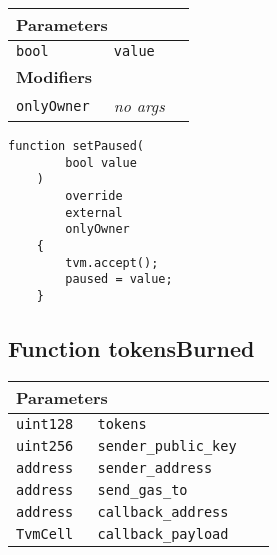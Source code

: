 \ifsoltables
\noindent\begin{tabular}{|l|l|p{5cm}|}\hline
\multicolumn{3}{|l|}{\bf Parameters}\\\hline
\tt bool & \tt value &\\\hline
\multicolumn{3}{|l|}{\bf Modifiers}\\\hline
\tt onlyOwner & {\em no args} &\\\hline
\end{tabular}
\fi

\vspace{2cm}

\begin{lstlisting}[firstnumber=407]
    function setPaused(
        bool value
    )
        override
        external
        onlyOwner
    {
        tvm.accept();
        paused = value;
    }
\end{lstlisting}

\subsection{Function tokensBurned}


\ifsoltables
\noindent\begin{tabular}{|l|l|p{5cm}|}\hline
\multicolumn{3}{|l|}{\bf Parameters}\\\hline
\tt uint128 & \tt tokens &\\\hline
\tt uint256 & \tt sender\_{}public\_{}key &\\\hline
\tt address & \tt sender\_{}address &\\\hline
\tt address & \tt send\_{}gas\_{}to &\\\hline
\tt address & \tt callback\_{}address &\\\hline
\tt TvmCell & \tt callback\_{}payload &\\\hline
\end{tabular}
\fi

\vspace{2cm}


